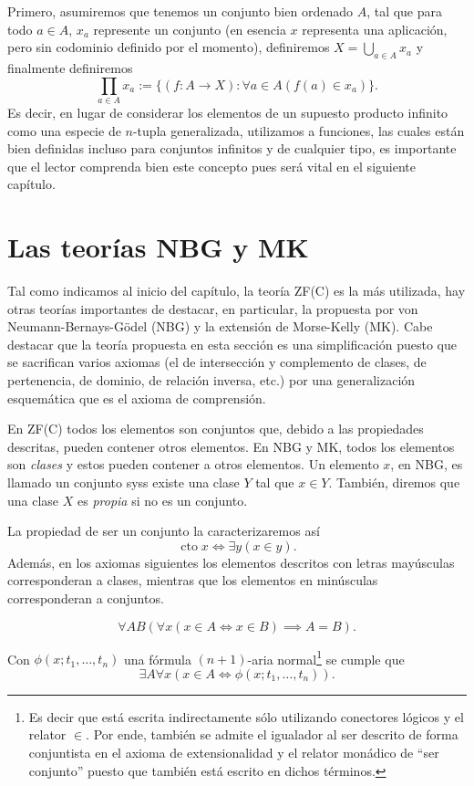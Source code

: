 \documentclass[11pt,a4paper]{book}
\DeclareMathOperator{\cto}{cto}
\begin{document}
Primero, asumiremos que tenemos un conjunto bien ordenado $A$, tal que para todo $a\in A$, $x_a$ represente un conjunto (en esencia $x$ representa una aplicación, pero sin codominio definido por el momento), definiremos $X=\bigcup_{a\in A}x_a$ y finalmente definiremos
$$\prod_{a\in A}x_a:=\{(f:A\rightarrow X):\forall a\in A(f(a)\in x_a)\}.$$
Es decir, en lugar de considerar los elementos de un supuesto producto infinito como una especie de $n$-tupla generalizada, utilizamos a funciones, las cuales están bien definidas incluso para conjuntos infinitos y de cualquier tipo, es importante que el lector comprenda bien este concepto pues será vital en el siguiente capítulo.

\section{Las teorías NBG y MK}
Tal como indicamos al inicio del capítulo, la teoría ZF(C) es la más utilizada, hay otras teorías importantes de destacar, en particular, la propuesta por von Neumann-Bernays-Gödel (NBG) y la extensión de Morse-Kelly (MK). Cabe destacar que la teoría propuesta en esta sección es una simplificación puesto que se sacrifican varios axiomas (el de intersección y complemento de clases, de pertenencia, de dominio, de relación inversa, etc.) por una generalización esquemática que es el axioma de comprensión.
\begin{mydef}[Clase]
	En ZF(C) todos los elementos son conjuntos que, debido a las propiedades descritas, pueden contener otros elementos. En NBG y MK, todos los elementos son \textit{clases} y estos pueden contener a otros elementos. Un elemento $x$, en NBG, es llamado un conjunto syss existe una clase $Y$ tal que $x\in Y$. También, diremos que una clase $X$ es \textit{propia} si no es un conjunto.
\end{mydef}
La propiedad de ser un conjunto la caracterizaremos así
$$\cto x\iff\exists y(x\in y).$$
Además, en los axiomas siguientes los elementos descritos con letras mayúsculas corresponderan a clases, mientras que los elementos en minúsculas corresponderan a conjuntos.
\begin{axiom}
	$$\forall AB(\forall x(x\in A\iff x\in B)\implies A=B).$$
\end{axiom}
\begin{axiom}
	Con $\phi(x;t_1,\dots,t_n)$ una fórmula $(n+1)$-aria normal\footnote{Es decir que está escrita indirectamente sólo utilizando conectores lógicos y el relator $\in$. Por ende, también se admite el igualador al ser descrito de forma conjuntista en el axioma de extensionalidad y el relator monádico de ``ser conjunto'' puesto que también está escrito en dichos términos.} se cumple que
	$$\exists A\forall x(x\in A\iff\phi(x;t_1,\dots,t_n)).$$
\end{axiom}
\end{document}

